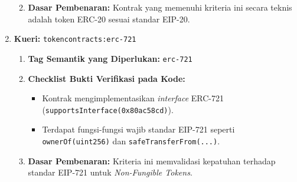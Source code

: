 \begin{enumerate}
\begin{enumerate}
\begin{itemize}
		            \end{itemize}
		      \item \textbf{Dasar Pembenaran:} Kontrak yang memenuhi kriteria ini secara teknis adalah token ERC-20 sesuai standar EIP-20.
	      \end{enumerate}
	\item \textbf{Kueri:} \texttt{token\textunderscore contracts:erc-721}
	      \begin{enumerate}
		      \item \textbf{Tag Semantik yang Diperlukan:} \texttt{erc-721}
		      \item \textbf{Checklist Bukti Verifikasi pada Kode:}
		            \begin{itemize}
			            \item Kontrak mengimplementasikan \textit{interface} ERC-721 \\(\texttt{supportsInterface(0x80ac58cd)}).
			            \item Terdapat fungsi-fungsi wajib standar EIP-721 seperti \\\texttt{ownerOf(uint256)} dan \texttt{safeTransferFrom(...)}.
		            \end{itemize}
		      \item \textbf{Dasar Pembenaran:} Kriteria ini memvalidasi kepatuhan terhadap standar EIP-721 untuk \textit{Non-Fungible Tokens}.
	      \end{enumerate}
\end{enumerate}

